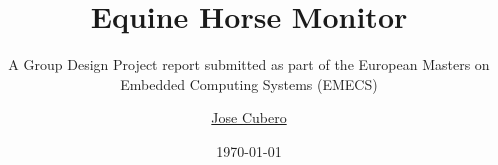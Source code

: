 
\newcommand{\mytitle}{Equine Horse Monitor}
\newcommand{\mysubtitle}{A Group Design Project report submitted as part of the European Masters on Embedded Computing Systems (EMECS)}
\newcommand{\myauthor}{ 
{\texorpdfstring{\href{mailto:jacc1g12@soton.ac.uk}{Jose Cubero}}{Jose Cubero}} 
}
\newcommand{\myauthori}{
\texorpdfstring{\href{mailto:mo1g12@soton.ac.uk}{Merve Oksar}}{Merve Oksar}
}
\newcommand{\myauthorii}{
\texorpdfstring{\href{mailto:kr2g12@soton.ac.uk}{Konke Radlow}}{Konke Radlow}
}
\newcommand{\myauthoriii}{
\texorpdfstring{\href{mailto:ms15g12@soton.ac.uk}{Michail Sidorov}}{Michail Sidorov}
}
\newcommand{\myauthoriv}{
 \texorpdfstring{\href{mailto:yu1g12@soton.ac.uk}{Yaman Umuroglu}}{Yaman Umuroglu}
}
\newcommand{\type}{GDP Project 2012/2013}
\newcommand{\fieldOfStudy}{EMECS}
\newcommand{\professor}{Dr. Peter Reid Wilson}
\newcommand{\professori}{Iain McNelly}
\newcommand{\location}{Southampton}
\newcommand{\semester}{Winter 2012}

\newcommand{\UNIVERSITY}{
\texorpdfstring{\href{http://www.soton.ac.uk}
{UNIVERSITY OF SOUTHAMPTON}}
{UNIVERSITY OF SOUTHAMPTON}}

\newcommand{\faculty}{
\texorpdfstring{\href{http://www.engineering.soton.ac.uk}
{Faculty of Engineering, Science and Mathematics}}
{Faculty of Engineering, Science and Mathematics}}


\title{\mytitle}
\subtitle{\mysubtitle}
\author{\myauthor}
\date{\today}




